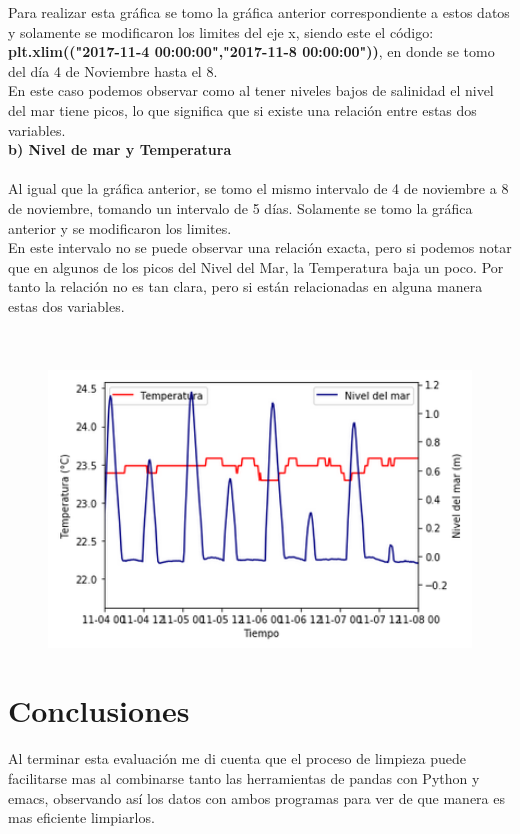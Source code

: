 \documentclass[12pt]{article}
\begin{document}
Para realizar esta gráfica se tomo la gráfica anterior correspondiente a estos datos y solamente se modificaron los limites del eje x, siendo este el código: \textbf{plt.xlim(("2017-11-4 00:00:00","2017-11-8 00:00:00"))}, en donde se tomo del día 4 de Noviembre hasta el 8. \\

En este caso podemos observar como al tener niveles bajos de salinidad el nivel del mar tiene picos, lo que significa que si existe una relación entre estas dos variables. \\

\noindent\textbf {b) Nivel de mar y Temperatura} \\ \\
Al igual que la gráfica anterior, se tomo el mismo intervalo de 4 de noviembre a 8 de noviembre, tomando un intervalo de 5 días. Solamente se tomo la gráfica anterior y se modificaron los limites. \\

En este intervalo no se puede observar una relación exacta, pero si podemos notar que en algunos de los picos del Nivel del Mar, la Temperatura baja un poco. Por tanto la relación no es tan clara, pero si están relacionadas en alguna manera estas dos variables. \\ \\ \\

\begin{figure}[h!]
    \centering
\includegraphics[width=5in]{SP2lim.png}
\end{figure}

\section{Conclusiones}
Al terminar esta evaluación me di cuenta que el proceso de limpieza puede facilitarse mas al combinarse tanto las herramientas de pandas con Python y emacs, observando así los datos con ambos programas para ver de que manera es mas eficiente limpiarlos. \\
\end{document}
